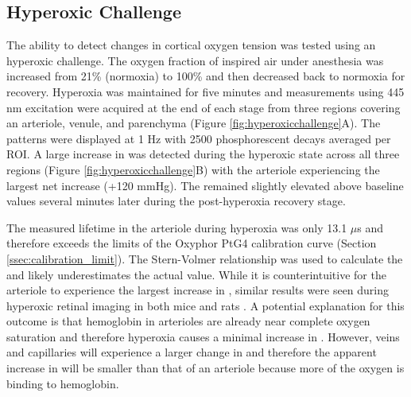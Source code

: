 \subsection{Hyperoxic Challenge}

The ability to detect changes in cortical oxygen tension was tested using an hyperoxic challenge. The oxygen fraction of inspired air under anesthesia was increased from 21\% (normoxia) to 100\% and then decreased back to normoxia for recovery. Hyperoxia was maintained for five minutes and  measurements using 445 nm excitation were acquired at the end of each stage from three regions covering an arteriole, venule, and parenchyma (Figure \ref{fig:hyperoxicchallenge}A). The patterns were displayed at 1 Hz with 2500 phosphorescent decays averaged per ROI. A large increase in  was detected during the hyperoxic state across all three regions (Figure \ref{fig:hyperoxicchallenge}B) with the arteriole experiencing the largest net increase (+120 mmHg). The  remained slightly elevated above baseline values several minutes later during the post-hyperoxia recovery stage.

The measured lifetime in the arteriole during hyperoxia was only 13.1 $\mu$s and therefore exceeds the limits of the Oxyphor PtG4 calibration curve (Section \ref{ssec:calibration_limit}). The Stern-Volmer relationship was used to calculate the  and likely underestimates the actual value. While it is counterintuitive for the arteriole to experience the largest increase in , similar results were seen during hyperoxic retinal imaging in both mice and rats \cite{Shonat:2003ia}. A potential explanation for this outcome is that hemoglobin in arterioles are already near complete oxygen saturation and therefore hyperoxia causes a minimal increase in . However, veins and capillaries will experience a larger change in  and therefore the apparent increase in  will be smaller than that of an arteriole because more of the oxygen is binding to hemoglobin.

